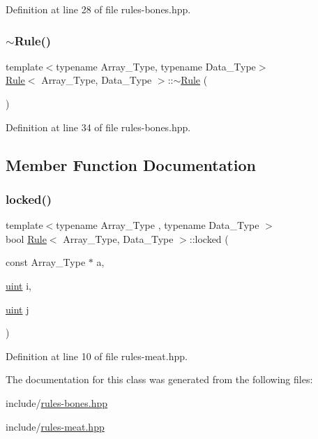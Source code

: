 Definition at line 28 of file rules-\/bones.\+hpp.

\mbox{\label{class_rule_a9f7e4ac4893005c7d4ecc2781f0f727d}} 
\subsubsection{\texorpdfstring{$\sim$\+Rule()}{~Rule()}}
{\footnotesize\ttfamily template$<$typename Array\+\_\+\+Type, typename Data\+\_\+\+Type$>$ \\
\hyperlink{class_rule}{Rule}$<$ Array\+\_\+\+Type, Data\+\_\+\+Type $>$\+::$\sim$\hyperlink{class_rule}{Rule} (\begin{DoxyParamCaption}{ }\end{DoxyParamCaption})\hspace{0.3cm}{\ttfamily [inline]}}



Definition at line 34 of file rules-\/bones.\+hpp.



\subsection{Member Function Documentation}
\mbox{\label{class_rule_a0a9a115c6951a5c8de699d4ff9f69060}} 
\subsubsection{\texorpdfstring{locked()}{locked()}}
{\footnotesize\ttfamily template$<$typename Array\+\_\+\+Type , typename Data\+\_\+\+Type $>$ \\
bool \hyperlink{class_rule}{Rule}$<$ Array\+\_\+\+Type, Data\+\_\+\+Type $>$\+::locked (\begin{DoxyParamCaption}\item[{const Array\+\_\+\+Type $\ast$}]{a,  }\item[{\hyperlink{typedefs_8hpp_a91ad9478d81a7aaf2593e8d9c3d06a14}{uint}}]{i,  }\item[{\hyperlink{typedefs_8hpp_a91ad9478d81a7aaf2593e8d9c3d06a14}{uint}}]{j }\end{DoxyParamCaption})\hspace{0.3cm}{\ttfamily [inline]}}



Definition at line 10 of file rules-\/meat.\+hpp.



The documentation for this class was generated from the following files\+:\begin{DoxyCompactItemize}
\item 
include/\hyperlink{rules-bones_8hpp}{rules-\/bones.\+hpp}\item 
include/\hyperlink{rules-meat_8hpp}{rules-\/meat.\+hpp}\end{DoxyCompactItemize}
